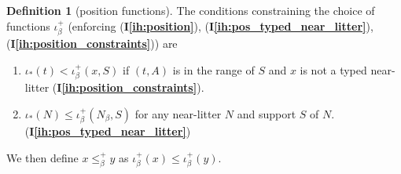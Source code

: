 \documentclass[112pt]{article}
\theoremstyle{definition}
\newtheorem{definition}[theorem]{Definition}
\theoremstyle{remark}
\newcommand{\ihref}[1]{(\textbf{I\ref{#1}})}
\newcommand{\rk}[1]{{\color{blue}\sl #1}}
\newcommand{\suggest}[1]{{\color{red} #1}}
\newcommand{\hsuggest}[1]{{\color{magenta}#1}}
\begin{document}
\begin{definition}[position functions]
\begin{comment}

\suggest{OMIT (with care):
$\iota_*^+(x,\emptyset)$ is defined as $\iota_*(\{x\})$. %
The well-ordering $\leq_{-1}^+$ is defined by $$(x,\emptyset) \leq_{-1}^+ (y,\emptyset) \leftrightarrow \iota_*(x) \leq \iota_*(y).$$}\hsuggest{GOOD CATCH!  I'm leaving this remark because it does need to be done carefully}

\hsuggest{This is genuinely tricky.  I suggest $\iota^+_*(x,\emptyset) = \iota_*(x)$.  I do not think that the constraints below act on choice of $\iota^+_*(x,\emptyset)$ at all.}

\end{comment}

\begin{comment}

The well-ordering $\leq_\alpha^+$ of $\tau_\alpha^+$ ($\alpha \in \lambda$) must satisfy the condition that for each $(x,S) \in \tau_\alpha^+$, for each $(z,A) \in {\tt rng}(S)$ and litter $L = f_{\beta,\gamma}(y,T)$ with $\beta<\alpha$,  where $L$  meets $z$, $\iota_*^+(y,T) < \iota_*^+(x,S)$ must hold.

\end{comment}

The conditions constraining the choice of functions $\iota^+_\beta$ %
 ({enforcing }\ihref{ih:position}, \ihref{ih:pos_typed_near_litter}, \ihref{ih:position_constraints}) are

\begin{enumerate}

\item $\iota_*(t) < \iota^+_\beta(x,S)$ if $(t,A)$ is in the range of $S$ and $x$ is not a typed near-litter {\ihref{ih:position_constraints}}.

\item $\iota_*(N) \leq \iota^+_\beta(N_\beta,S)$ for any near-litter $N$ and support $S$ of $N$.%
 \ihref{ih:pos_typed_near_litter} %

\end{enumerate}

We then define $x \leq^+_\beta y$ as $\iota^+_\beta(x) \leq \iota^+_\beta(y)$.
\end{definition}
\end{document}
